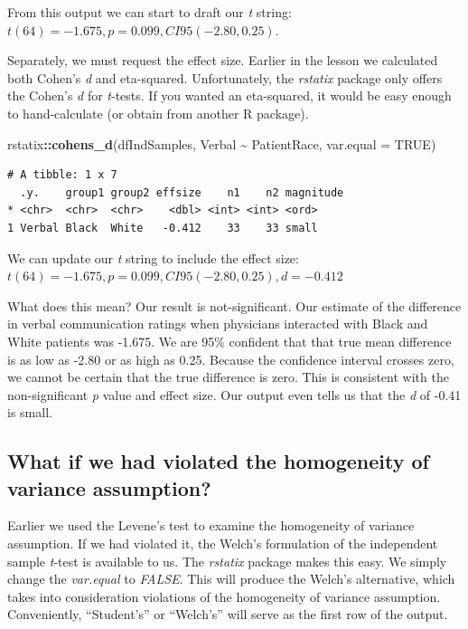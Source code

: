 \documentclass[
  11pt,
]{book}
\newenvironment{Shaded}{\begin{snugshade}}{\end{snugshade}}
\newcommand{\AttributeTok}[1]{\textcolor[rgb]{0.27,0.27,0.27}{#1}}
\newcommand{\ConstantTok}[1]{\textcolor[rgb]{0.37,0.37,0.37}{#1}}
\newcommand{\FunctionTok}[1]{\textcolor[rgb]{0.27,0.27,0.27}{\textbf{#1}}}
\newcommand{\NormalTok}[1]{#1}
\newcommand{\SpecialCharTok}[1]{\textcolor[rgb]{0.43,0.43,0.43}{\textbf{#1}}}
\begin{document}
From this output we can start to draft our \emph{t} string: \(t(64) = -1.675, p = 0.099, CI95(-2.80, 0.25)\).

Separately, we must request the effect size. Earlier in the lesson we calculated both Cohen's \emph{d} and eta-squared. Unfortunately, the \emph{rstatix} package only offers the Cohen's \emph{d} for \emph{t}-tests. If you wanted an eta-squared, it would be easy enough to hand-calculate (or obtain from another R package).

\begin{Shaded}
\begin{Highlighting}[]
\NormalTok{rstatix}\SpecialCharTok{::}\FunctionTok{cohens\_d}\NormalTok{(dfIndSamples, Verbal }\SpecialCharTok{\textasciitilde{}}\NormalTok{ PatientRace, }\AttributeTok{var.equal =} \ConstantTok{TRUE}\NormalTok{)}
\end{Highlighting}
\end{Shaded}

\begin{verbatim}
# A tibble: 1 x 7
  .y.    group1 group2 effsize    n1    n2 magnitude
* <chr>  <chr>  <chr>    <dbl> <int> <int> <ord>    
1 Verbal Black  White   -0.412    33    33 small    
\end{verbatim}

We can update our \emph{t} string to include the effect size: \(t(64) = -1.675, p = 0.099, CI95(-2.80, 0.25), d = -0.412\)

What does this mean? Our result is not-significant. Our estimate of the difference in verbal communication ratings when physicians interacted with Black and White patients was -1.675. We are 95\% confident that that true mean difference is as low as -2.80 or as high as 0.25. Because the confidence interval crosses zero, we cannot be certain that the true difference is zero. This is consistent with the non-significant \emph{p} value and effect size. Our output even tells us that the \emph{d} of -0.41 is small.

\hypertarget{what-if-we-had-violated-the-homogeneity-of-variance-assumption}{%
\subsection{What if we had violated the homogeneity of variance assumption?}\label{what-if-we-had-violated-the-homogeneity-of-variance-assumption}}

Earlier we used the Levene's test to examine the homogeneity of variance assumption. If we had violated it, the Welch's formulation of the independent sample \emph{t}-test is available to us. The \emph{rstatix} package makes this easy. We simply change the \emph{var.equal} to \emph{FALSE}. This will produce the Welch's alternative, which takes into consideration violations of the homogeneity of variance assumption. Conveniently, ``Student's'' or ``Welch's'' will serve as the first row of the output.
\end{document}
